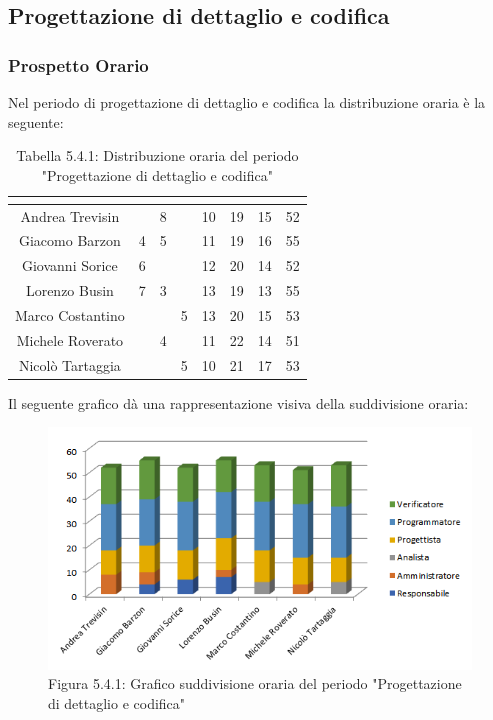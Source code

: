 \subsection{Progettazione di dettaglio e codifica}

\subsubsection{Prospetto Orario}
Nel periodo di progettazione di dettaglio e codifica la distribuzione oraria è la seguente:

\renewcommand{\arraystretch}{1.5}
\begin{table}[H]
\begin{center}
\begin{tabular}{|c|c|c|c|c|c|c|c|}
\hline
\rowcolor{title_row}
\textbf{\color{title_text}{Nome}} & \textbf{\color{title_text}{Resp.}} & \textbf{\color{title_text}{Ammi.}} & \textbf{\color{title_text}{Analist.}} & \textbf{\color{title_text}{Progett.}} & \textbf{\color{title_text}{Program.}} & \textbf{\color{title_text}{Verific.}} & \textbf{\color{title_text}{Totale}} \\ \hline
Andrea Trevisin  & & 8 & & 10 & 19 & 15 & 52  \\ \hline
Giacomo Barzon   & 4 & 5 & & 11 & 19 & 16 & 55 \\ \hline
Giovanni Sorice  & 6 & & & 12 & 20 & 14 & 52  \\ \hline
Lorenzo Busin    & 7 & 3 & & 13 & 19 & 13 & 55  \\ \hline
Marco Costantino & & & 5 & 13 & 20 & 15 & 53 \\ \hline
Michele Roverato & & 4 & & 11 & 22 & 14 & 51  \\ \hline
Nicolò Tartaggia & & & 5 & 10 & 21 & 17 & 53  \\ \hline
\end{tabular}
\caption{Tabella 5.4.1: Distribuzione oraria del periodo "Progettazione di dettaglio e codifica"\label{}}
\end{center}
\end{table}
\renewcommand{\arraystretch}{1}

Il seguente grafico dà una rappresentazione visiva della suddivisione oraria: \\
\begin{figure} [H]
	\centering
	\includegraphics[scale=1]{Res/ExcelGrafici/Grafici/CodificaOre.png}
	\caption{Figura 5.4.1: Grafico suddivisione oraria del periodo "Progettazione di dettaglio e codifica"}\label{}
\end{figure}


